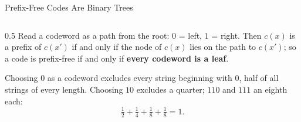 \begin{frame}{Prefix-Free Codes Are Binary Trees}
  \small
  \begin{columns}[T]
    \begin{column}{0.5\textwidth}
      Read a codeword as a path from the root: $0$ = left, $1$ = right. Then $c(x)$ is a prefix of $c(x')$ if and only if the node of $c(x)$ lies on the path to $c(x')$; so a code is prefix-free if and only if \textbf{every codeword is a leaf}.
      \medskip

      Choosing $0$ as a codeword excludes every string beginning with $0$, half of all strings of every length. Choosing $10$ excludes a quarter; $110$ and $111$ an eighth each:
      \[
        \tfrac12+\tfrac14+\tfrac18+\tfrac18=1 .
      \]
      \medskip


\end{column}
\end{columns}
\end{frame}
